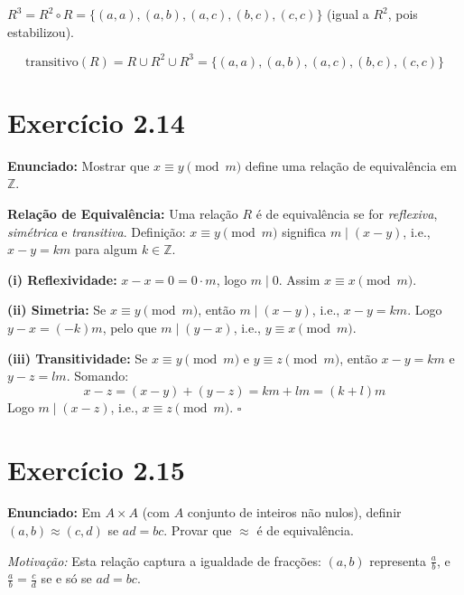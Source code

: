 \documentclass[12pt,a4paper]{article}
\begin{document}
$R^3 = R^2 \circ R = \{(a,a),(a,b),(a,c),(b,c),(c,c)\}$ (igual a $R^2$, pois estabilizou).

\[
\text{transitivo}(R) = R \cup R^2 \cup R^3 = \{(a,a),(a,b),(a,c),(b,c),(c,c)\}
\]

\section*{Exercício 2.14}

\textbf{Enunciado:} Mostrar que $x \equiv y \pmod{m}$ define uma relação de equivalência em $\mathbb{Z}$.

\begin{teoribox}
\textbf{Relação de Equivalência:} Uma relação $R$ é de equivalência se for \emph{reflexiva}, \emph{simétrica} e \emph{transitiva}. Definição: $x \equiv y \pmod{m}$ significa $m \mid (x - y)$, i.e., $x - y = km$ para algum $k \in \mathbb{Z}$.
\end{teoribox}

\textbf{(i) Reflexividade:} $x - x = 0 = 0 \cdot m$, logo $m \mid 0$. Assim $x \equiv x \pmod{m}$.

\textbf{(ii) Simetria:} Se $x \equiv y \pmod{m}$, então $m \mid (x - y)$, i.e., $x - y = km$. Logo $y - x = (-k)m$, pelo que $m \mid (y - x)$, i.e., $y \equiv x \pmod{m}$.

\textbf{(iii) Transitividade:} Se $x \equiv y \pmod{m}$ e $y \equiv z \pmod{m}$, então $x - y = km$ e $y - z = lm$. Somando:
\[
x - z = (x - y) + (y - z) = km + lm = (k + l)m
\]
Logo $m \mid (x - z)$, i.e., $x \equiv z \pmod{m}$. \hfill$\square$

\section*{Exercício 2.15}

\textbf{Enunciado:} Em $A \times A$ (com $A$ conjunto de inteiros não nulos), definir $(a,b) \approx (c,d)$ se $ad = bc$. Provar que $\approx$ é de equivalência.

\begin{notabox}
\textit{Motivação:} Esta relação captura a igualdade de fracções: $(a,b)$ representa $\frac{a}{b}$, e $\frac{a}{b} = \frac{c}{d}$ se e só se $ad = bc$.
\end{notabox}
\end{document}
